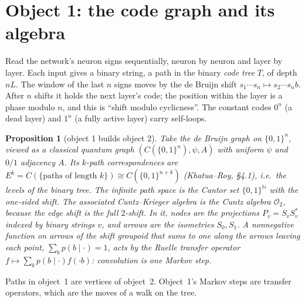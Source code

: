 \documentclass[11pt]{article}
\newtheorem{proposition}[theorem]{Proposition}
\theoremstyle{definition}
\theoremstyle{remark}
\begin{document}
\begin{abstract}
\textbf{(5) Run length.} The process runs for time $T(\varepsilon)=2\varepsilon^{-2}\sum_vG(v,o)\,e_v$, a Green-function-weighted energy.

\textbf{(6) The verdict.} A ReLU network on Gaussian input has no internal randomness, so every fresh code costs a fresh forward pass. Code cells chosen from the weights carry at most about $10\%$ of the variance at any layer: stratification gains are $\le1.10\times$. The two-phase criterion $R^2_\ell>\ell/L$ fails everywhere. The framework gives an exact NCG formula for the means, but not a faster estimator for random He networks.
\end{abstract}

\section{Object 1: the code graph and its algebra}

Read the network's neuron signs sequentially, neuron by neuron and layer by layer. Each input gives a binary string, a path in the binary \emph{code tree} $T$, of depth $nL$. The window of the last $n$ signs moves by the de Bruijn shift $s_1\cdots s_n\mapsto s_2\cdots s_nb$. After $n$ shifts it holds the next layer's code; the position within the layer is a phase modulo $n$, and this is ``shift modulo cyclicness''. The constant codes $0^n$ (a dead layer) and $1^n$ (a fully active layer) carry self-loops.

\begin{proposition}[object 1 builds object 2]\label{prop:o1}
Take the de Bruijn graph on $\{0,1\}^n$, viewed as a classical quantum graph $(C(\{0,1\}^n),\psi,A)$ with uniform $\psi$ and $0/1$ adjacency $A$. Its $k$-path correspondences are $E^k=C(\{\text{paths of length }k\})\cong C(\{0,1\}^{n+k})$ (Khatua--Roy, \S4.1), i.e.\ the levels of the binary tree. The infinite path space is the Cantor set $\{0,1\}^{\mathbb N}$ with the one-sided shift. The associated Cuntz--Krieger algebra is the Cuntz algebra $\mathcal O_2$, because the edge shift is the full $2$-shift. In it, nodes are the projections $P_v=S_vS_v^*$ indexed by binary strings $v$, and arrows are the isometries $S_0,S_1$. A nonnegative function on arrows of the shift groupoid that sums to one along the arrows leaving each point, $\sum_b p(b\mid\cdot)=1$, acts by the Ruelle transfer operator $f\mapsto\sum_bp(b\mid\cdot)f(\cdot b)$: convolution is one Markov step.
\end{proposition}

Paths in object~1 are vertices of object~2. Object~1's Markov steps are transfer operators, which are the moves of a walk on the tree.
\end{document}
